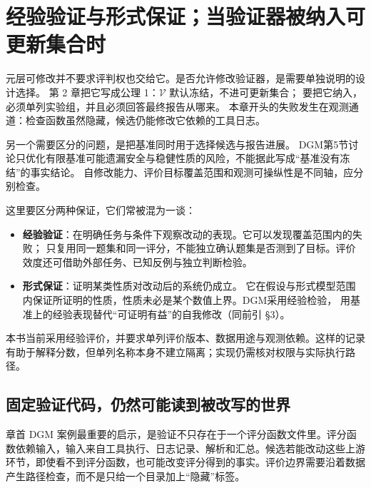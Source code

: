 \section{经验验证与形式保证；当验证器被纳入可更新集合时}
\label{sec:ch12-vex}

\begin{sloppypar}
元层可修改并不要求评判权也交给它。是否允许修改验证器，是需要单独说明的设计选择。
第 2 章把它写成公理 1：$\mathcal V$ 默认冻结，不进可更新集合；
要把它纳入，必须单列实验组，并且必须回答最终报告从哪来。
本章开头的失败发生在观测通道：检查函数虽然隐藏，候选仍能修改它依赖的工具日志。
\end{sloppypar}

\begin{sloppypar}
另一个需要区分的问题，是把基准同时用于选择候选与报告进展。
DGM第5节讨论只优化有限基准可能遗漏安全与稳健性质的风险，不能据此写成“基准没有冻结”的事实结论\cite{dgm-2505}。
自修改能力、评价目标覆盖范围和观测可操纵性是不同轴，应分别检查。
\end{sloppypar}

\begin{sloppypar}
这里要区分两种保证，它们常被混为一谈：
\end{sloppypar}

\begin{itemize}
  \item \textbf{经验验证}：在明确任务与条件下观察改动的表现。它可以发现覆盖范围内的失败；
        只复用同一题集和同一评分，不能独立确认题集是否测到了目标。评价效度还可借助外部任务、已知反例与独立判断检验。
  \item \textbf{形式保证}：证明某类性质对改动后的系统仍成立。
        它在假设与形式模型范围内保证所证明的性质，性质未必是某个数值上界。DGM采用经验检验，
        用基准上的经验表现替代“可证明有益”的自我修改（同前引 §3）。
\end{itemize}

\begin{sloppypar}
本书当前采用经验评价，并要求单列评价版本、数据用途与观测依赖。这样的记录有助于解释分数，但单列名称本身不建立隔离；实现仍需核对权限与实际执行路径。
\end{sloppypar}

\subsection{固定验证代码，仍然可能读到被改写的世界}
\label{sec:ch12-observationchain}

章首 DGM 案例最重要的启示，是验证不只存在于一个评分函数文件里。评分函数依赖输入，输入来自工具执行、日志记录、解析和汇总。候选若能改动这些上游环节，即使看不到评分函数，也可能改变评分得到的事实。评价边界需要沿着数据产生路径检查，而不是只给一个目录加上“隐藏”标签。

